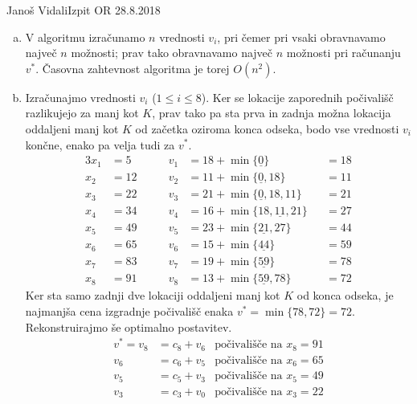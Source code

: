 \begin{naloga}{Janoš Vidali}{Izpit OR 28.8.2018}
\begin{odgovor}
\begin{enumerate}[(a)]
\item V algoritmu izračunamo $n$ vrednosti $v_i$,
pri čemer pri vsaki obravnavamo največ $n$ možnosti;
prav tako obravnavamo največ $n$ možnosti pri računanju $v^*$.
Časovna zahtevnost algoritma je torej $O(n^2)$.

\item Izračunajmo vrednosti $v_i$ ($1 \le i \le 8$).
Ker se lokacije zaporednih počivališč razlikujejo za manj kot $K$,
prav tako pa sta prva in zadnja možna lokacija
oddaljeni manj kot $K$ od začetka oziroma konca odseka,
bodo vse vrednosti $v_i$ končne,
enako pa velja tudi za $v^*$.
\begin{alignat*}{3}
x_1 &= 5  &\qquad v_1 &= 18 + \min\{\underline{0}\} &&= 18 \\
x_2 &= 12 &\qquad v_2 &= 11 + \min\{\underline{0}, 18\} &&= 11 \\
x_3 &= 22 &\qquad v_3 &= 21 + \min\{\underline{0}, 18, 11\} &&= 21 \\
x_4 &= 34 &\qquad v_4 &= 16 + \min\{18, \underline{11}, 21\} &&= 27 \\
x_5 &= 49 &\qquad v_5 &= 23 + \min\{\underline{21}, 27\} &&= 44 \\
x_6 &= 65 &\qquad v_6 &= 15 + \min\{\underline{44}\} &&= 59 \\
x_7 &= 83 &\qquad v_7 &= 19 + \min\{\underline{59}\} &&= 78 \\
x_8 &= 91 &\qquad v_8 &= 13 + \min\{\underline{59}, 78\} &&= 72
\end{alignat*}
Ker sta samo zadnji dve lokaciji oddaljeni manj kot $K$ od konca odseka,
je najmanjša cena izgradnje počivališč enaka $v^* = \min\{78, 72\} = 72$.
Re\-kon\-stru\-iraj\-mo še optimalno postavitev.
\begin{align*}
v^* = v_8 &= c_8 + v_6 & \text{počivališče na $x_8 = 91$} \\
v_6 &= c_6 + v_5 & \text{počivališče na $x_6 = 65$} \\
v_5 &= c_5 + v_3 & \text{počivališče na $x_5 = 49$} \\
v_3 &= c_3 + v_0 & \text{počivališče na $x_3 = 22$} \\
\end{align*}
\end{enumerate}
\end{odgovor}
\end{naloga}
